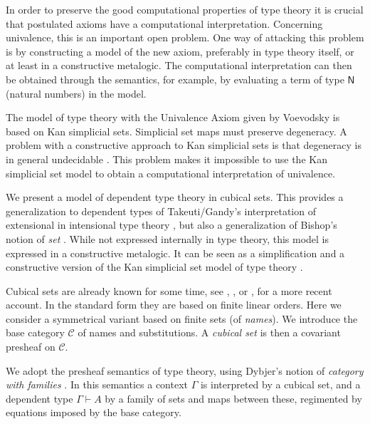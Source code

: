 \documentclass[10pt,a4paper]{article}
\newcommand{\CC}{{\mathcal C}}
\newcommand{\nat}{\mathsf{N}}
\begin{document}
In order to preserve the good computational properties of type theory
it is crucial that postulated axioms have a computational
interpretation.  Concerning univalence, this is an important open
problem.  One way of attacking this problem is by constructing a model
of the new axiom, preferably in type theory itself, or at least in a
constructive metalogic.  The computational interpretation can then be
obtained through the semantics, for example, by evaluating a term of
type $\nat$ (natural numbers) in the model.

The model of type theory with the Univalence Axiom given by Voevodsky
\cite{Voevodsky} is based on Kan simplicial sets.
Simplicial set maps must preserve degeneracy.
A problem with a constructive approach to
Kan simplicial sets is that degeneracy is in general undecidable \cite{BC}.
This problem makes it impossible to use the Kan simplicial set model
to obtain a computational interpretation of univalence.

We present a model of dependent type theory in cubical sets.  This
provides a generalization to dependent types of Takeuti/Gandy's
interpretation of extensional in intensional type theory \cite{Gandy},
but also a generalization of Bishop's notion of {\em set}
\cite{Bishop}.  While not expressed internally in type theory, this
model is expressed in a constructive metalogic.  It can be seen as a
simplification and a constructive version of the Kan simplicial set
model of type theory \cite{Voevodsky}.

Cubical sets are already known for some time, see \cite{Serre}, \cite{Kan},
or \cite{Crans}, \cite{Williamson} for a more recent account.
In the standard form they are based on finite linear orders.
Here we consider a symmetrical variant based on finite sets (of \emph{names}).
We introduce the base category $\CC$ of names and substitutions.
A \emph{cubical set} is then a covariant presheaf on $\CC$.

We adopt the presheaf semantics of type theory, using Dybjer's notion
of \emph{category with families} \cite{Dybjer}.  In this semantics a
context $\Gamma$ is interpreted by a cubical set, and a dependent type
$\Gamma\vdash A$ by a family of sets and maps between these,
regimented by equations imposed by the base category.


\end{document}

